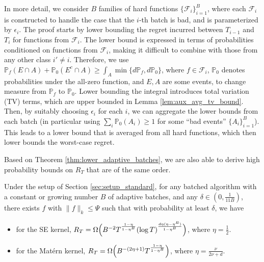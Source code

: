 \documentclass[10pt]{article}
\begin{document}
In more detail,
we consider $B$ families of hard functions $\{\mathcal{F}_i\}_{i=1}^B$, where each $\mathcal{F}_i$ is constructed to handle the case that the $i$-th batch is bad, and is parameterized by $\epsilon_i$. 
The proof starts by lower bounding the regret incurred between $T_{i-1} $ and $T_i$ for functions from $\mathcal{F}_i$. The lower bound is expressed in terms of probabilities conditioned on functions from $\mathcal{F}_i$, making it difficult to combine with those from any other class $i' \neq i$. 
Therefore, we use
$\mathbb{P}_{f}(E\cap A) + \mathbb{P}_{0}(E^c\cap A) \geq \int_A \min\{d\mathbb{P}_f, d\mathbb{P}_0\}$,
where $f \in \mathcal{F}_i$, $\mathbb{P}_0 $ denotes probabilities under the all-zero function, and $E,A$ are some events, 
to change measure from $\mathbb{P}_{f}$ to $\mathbb{P}_{0}$. Lower bounding the integral introduces total variation (TV) terms, which are upper bounded in Lemma \ref{lem:aux_avg_tv_bound}.
Then, by suitably choosing $\epsilon_i$ for each $i$, we can aggregate the lower bounds from each batch (in particular using $\sum_i \mathbb{P}_0(A_i) \geq 1$ for some ``bad events'' $\{A_i\}_{i=1}^B$). This leads to a lower bound that is averaged from all hard functions, which then lower bounds the worst-case regret.

Based on Theorem \ref{thm:lower_adaptive_batches}, we are also able to derive high probability bounds on $R_T$ that are of the same order.

\begin{corollary}
    \label{cor:lower_adaptive_batches}
    Under the setup of Section \ref{sec:setup_standard},
    for any batched algorithm with a constant or growing number $B$ of adaptive batches, and any $\delta \in (0,\frac{1}{11B})$, there exists $f$ with $ \lVert f\rVert_k \leq \Psi $ such that with probability at least $\delta$, we have
    \begin{itemize} 
        \item for the SE kernel, $R_T = \Omega\Bigl(B^{-2}T^{\frac{1-\eta}{1-\eta^B}}(\log T)^{\frac{d\eta(\eta-\eta^B)}{1-\eta^B}} \Bigr)$, where $\eta=\frac{1}{2}$.
        \item for the Mat\'ern kernel, $R_T =\Omega\Bigl(B^{-(2\eta+1)}T^{\frac{1-\eta}{1-\eta^B}} \Bigr)$, where $\eta=\frac{\nu}{2\nu+d}$.
    \end{itemize}    
\end{corollary}
\end{document}
